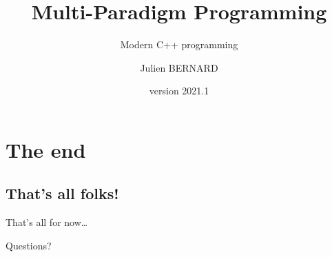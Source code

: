 \documentclass[english,10pt]{beamer}
\title{Multi-Paradigm Programming}
\subtitle{Modern C++ programming}
\author{Julien BERNARD}
\institute[Univ. Franche-Comté]{Université de Franche-Comté, France}
\date{version 2021.1}
\begin{document}
\begin{frame}
  \titlepage
\end{frame}








% 

\section*{The end}

\subsection*{That's all folks!}

\begin{frame}{That's all for now\ldots}{}
  \begin{block}{}
    \begin{center}
      Questions?
    \end{center}
  \end{block}
\end{frame}


\end{document}
